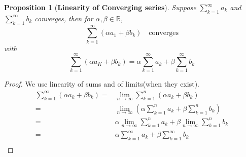 \documentclass[12pt]{article}
\theoremstyle{plain}
\newtheorem{proposition}{Proposition}[subsection]
\newcommand{\mR}{{\mathbb{R}}}
\begin{document}
\begin{proposition}[\textbf{Linearity of Converging series}]
	Suppose $\sum_{k=1}^{\infty} a_k$ and $\sum_{k=1}^{\infty} b_k$ converges,
	then for $\alpha, \beta \in \mR$, 
	\[
		\sum_{k=1}^{\infty} (\alpha a_1 + \beta b_k) \quad \text{converges}
	\]
	with 
	\[
		\sum_{k=1}^{\infty}(\alpha a_K +\beta b_k)
		= \alpha \sum_{k=1}^{\infty} a_k + \beta \sum_{k=1}^{\infty} b_k
	\]
\end{proposition}
\begin{proof}
	We use linearity of sums and of limits(when they exist). 
	\begin{align*}
		\sum_{k=1}^{\infty} (\alpha a_k + \beta b_k) 
		=& \lim_{n\to\infty} \sum_{k=1}^n (\alpha a_k + \beta b_k)\\
		=& \lim_{n\to\infty} (\alpha \sum_{k=1}^n a_k
		+ \beta \sum_{k=1}^n b_k)\\
		=& \alpha \lim_{n\to\infty} \sum_{k=1}^n a_k
		+ \beta \lim_{n\to\infty} \sum_{k=1}^n b_k \tag{some limit exist}\\
		=& \alpha \sum_{k=1}^{\infty} a_k + \beta \sum_{k=1}^{\infty} b_k\\
	\end{align*}
\end{proof}
\end{document}
